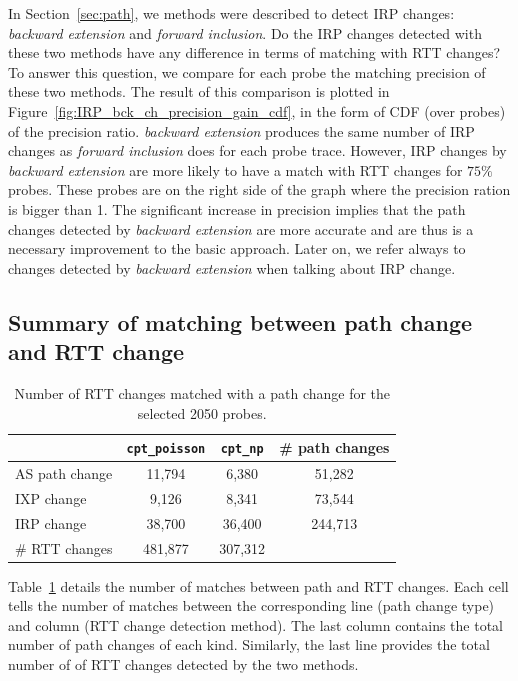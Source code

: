In Section~\ref{sec:path}, we methods were described to detect \ac{IRP} changes: \textit{backward extension} and \textit{forward inclusion}.
Do the \ac{IRP} changes detected with these two methods have any difference in terms of matching with RTT changes?
To answer this question, we compare for each probe the matching precision of these two methods.
The result of this comparison is plotted in Figure~\ref{fig:IRP_bck_ch_precision_gain_cdf}, in the form of CDF (over probes) of the precision ratio.
\textit{backward extension} produces the same number of \ac{IRP} changes as \textit{forward inclusion} does for each probe trace.
However, \ac{IRP} changes by \textit{backward extension} are more likely to have a match with RTT changes for $75\%$ probes.
These probes are on the right side of the graph where the precision ration is bigger than 1.	
The significant increase in precision implies that the path changes detected by \textit{backward extension} are more accurate and are thus is a necessary improvement to the basic approach.
Later on, we refer always to changes detected by \textit{backward extension} when talking about \ac{IRP} change.

\subsection{Summary of matching between path change and RTT change}

\begin{table}[!htb]
\caption{Number of RTT changes matched with a path change for the selected 2050 probes.}
\label{tab:corr_overview}
\centering
\footnotesize
\setlength{\tabcolsep}{0.5em}
\begin{tabular}{l|cc|c}
\toprule
& \texttt{cpt\_poisson} & \texttt{cpt\_np} & \# path changes\\
\midrule
AS path change & 11,794 & 6,380 & 51,282 \\
IXP change & 9,126 & 8,341 & 73,544\\
IRP change & 38,700 & 36,400 & 244,713\\
\midrule
\# RTT changes & 481,877 & 307,312 & \\
\bottomrule
\end{tabular}
\end{table}

Table~\ref{tab:corr_overview} details the number of matches between path and RTT changes.
Each cell tells the number of matches between the corresponding line (path change type) and column (RTT change detection method).
The last column contains the total number of path changes of each kind.
Similarly, the last line provides the total number of of RTT changes detected by the two methods.

